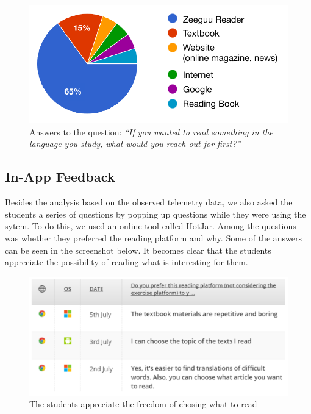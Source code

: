  \begin{figure}[h!]
    \centering
      \includegraphics[width=\columnwidth]{figures/opinions/reader_vs_textbook}
      \caption{Answers to the question: {\em ``If you wanted to read something in the language you study, what would you reach out for first?''}}
      \label{fig:preferred_reader}
    \end{figure}



\subsection{In-App Feedback}
Besides the analysis  based on the observed telemetry data, we also asked the students a series of questions by popping up questions while they were using the sytem. To do this, we used an online tool called HotJar. Among the questions was whether they preferred the reading platform and why. Some of the answers can be seen in the screenshot below. It becomes clear that the students appreciate the possibility of reading what is interesting for them.

    \begin{figure}[h!]
    \centering
      \includegraphics[width=\columnwidth]{figures/opinion_on_reading_platform}
      \caption{The students appreciate the freedom of chosing what to read}
    \end{figure}


